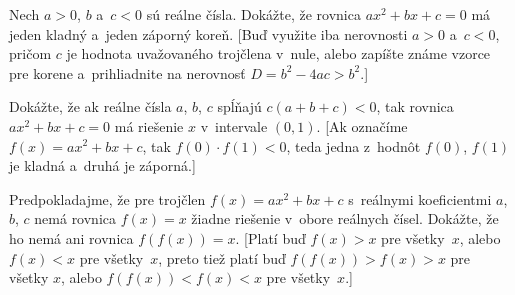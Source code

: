 {
Nech $a>0$, $b$ a~$c<0$ sú reálne čísla. Dokážte, že
rovnica $ax^2+bx+c=0$ má jeden kladný a~jeden záporný koreň.
[Buď využite iba nerovnosti
$a>0$ a~$c<0$, pričom $c$ je hodnota uvažovaného trojčlena v~nule,
alebo zapíšte známe vzorce pre korene
a~prihliadnite na nerovnosť $D=b^2-4ac>b^2$.]

\D
Dokážte, že ak reálne čísla $a$, $b$, $c$ spĺňajú
$c(a+b+c)<0$, tak rovnica $ax^2+bx+c=0$ má riešenie $x$ v~intervale
$(0,1)$. [Ak označíme $f(x)=ax^2+bx+c$, tak $f(0)\cdot f(1)<0$, teda
jedna z~hodnôt $f(0)$, $f(1)$ je kladná a~druhá je záporná.]

Predpokladajme, že pre trojčlen $f(x)=ax^2+bx+c$ s~reálnymi koeficientmi
$a$, $b$, $c$ nemá rovnica $f(x)=x$ žiadne riešenie v~obore reálnych čísel.
Dokážte, že ho nemá ani rovnica $f(f(x))=x$.
[Platí buď $f(x)>x$ pre všetky~$x$, alebo $f(x)<x$ pre všetky~$x$,
preto tiež platí buď $f(f(x))>f(x)>x$ pre všetky $x$, alebo $f(f(x))<f(x)<x$
pre všetky~$x$.]
}

